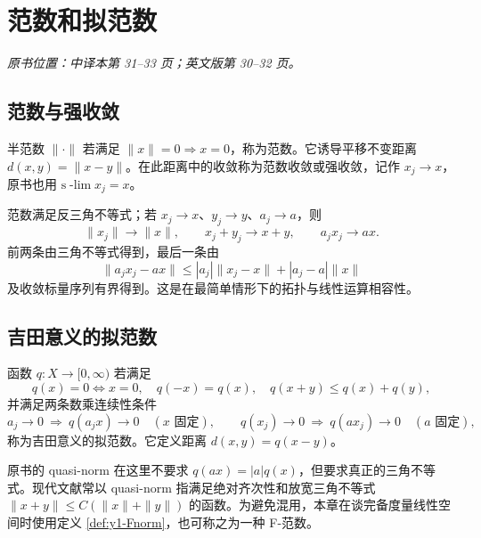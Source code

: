 \section{范数和拟范数}\label{sec:yosida-01-02}
\noindent\textit{原书位置：中译本第 31--33 页；英文版第 30--32 页。}

\subsection{范数与强收敛}
\begin{definition}[赋范线性空间]
半范数 $\|\cdot\|$ 若满足 $\|x\|=0\Rightarrow x=0$，称为范数。它诱导平移不变距离 $d(x,y)=\|x-y\|$。在此距离中的收敛称为范数收敛或强收敛，记作 $x_j\to x$，原书也用 $\mathrm{s}\!\operatorname{-lim}x_j=x$。
\end{definition}
范数满足反三角不等式；若 $x_j\to x$、$y_j\to y$、$a_j\to a$，则
\[
 \|x_j\|\to\|x\|,\qquad x_j+y_j\to x+y,\qquad a_jx_j\to ax.
\]
前两条由三角不等式得到，最后一条由
\[
 \|a_jx_j-ax\|\le |a_j|\|x_j-x\|+|a_j-a|\|x\|
\]
及收敛标量序列有界得到。这是在最简单情形下的拓扑与线性运算相容性。

\subsection{吉田意义的拟范数}
\begin{definition}\label{def:y1-Fnorm}
函数 $q:X\to[0,\infty)$ 若满足
\[
 q(x)=0\Longleftrightarrow x=0,\quad q(-x)=q(x),\quad
 q(x+y)\le q(x)+q(y),
\]
并满足两条数乘连续性条件
\[
 a_j\to0\ \Longrightarrow\ q(a_jx)\to0\quad(x\text{ 固定}),\qquad
 q(x_j)\to0\ \Longrightarrow\ q(ax_j)\to0\quad(a\text{ 固定}),
\]
称为吉田意义的拟范数。它定义距离 $d(x,y)=q(x-y)$。
\end{definition}
\begin{remark}[补充：与现代术语的区别]
原书的 quasi-norm 在这里不要求 $q(ax)=|a|q(x)$，但要求真正的三角不等式。现代文献常以 quasi-norm 指满足绝对齐次性和放宽三角不等式 $\|x+y\|\le C(\|x\|+\|y\|)$ 的函数。为避免混用，本章在谈完备度量线性空间时使用定义 \ref{def:y1-Fnorm}，也可称之为一种 F-范数。
\end{remark}

